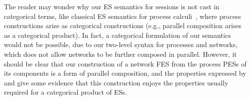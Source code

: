  The reader may wonder why our ES semantics for sessions is not
cast in categorical terms, like classical ES semantics for process
calculi~\cite{Win80, CZ97}, where process constructions arise as
categorical constructions (e.g., parallel composition arises
as a categorical product).  In fact, a categorical formulation of our
semantics would not be possible, due to our two-level syntax for
processes and networks, which does not allow networks to be further
composed in parallel. However, it should be clear that our
construction of a network FES from the process PESs of its
components is a form of parallel composition, and the properties
expressed by  and
 give some evidence that this
construction enjoys the properties usually required for a categorical
product of ESs.  



